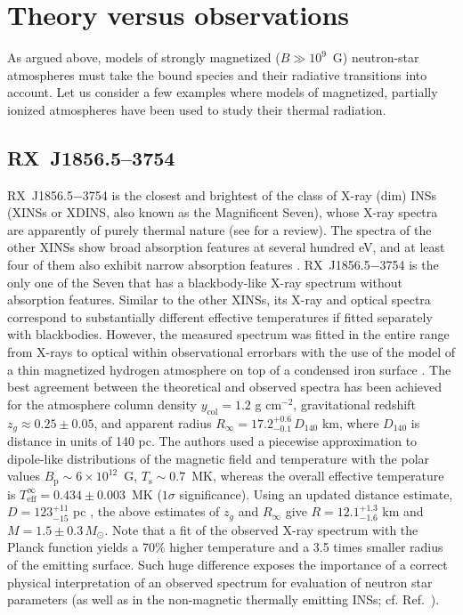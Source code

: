 \documentclass{pos1}
\newcommand{\Teff}{T_\mathrm{eff}}
\newcommand{\Ts}{T_\mathrm{s}}
\newcommand{\ycol}{y_\mathrm{col}}
\begin{document}
\section{Theory versus observations}
\label{sec:obs}

As argued above,  models of strongly magnetized ($B\gg10^9$~G)
neutron-star atmospheres must take the bound species and their
radiative transitions into account. Let us consider a few examples
where models of magnetized, partially ionized atmospheres have been
used to study their thermal radiation.

\subsection{RX~J1856.5--3754}
\label{sec:1856}

RX~J1856.5$-$3754 is the closest and brightest of the class of X-ray
(dim) INSs (XINSs or XDINS, also known as the Magnificent Seven), whose X-ray
spectra are apparently of purely thermal nature (see \cite{Turolla09}
for a review). The spectra of the other XINSs show broad absorption
features at several hundred eV, and at least four of them also exhibit
narrow absorption features \cite{Hohle_ea12}. RX~J1856.5$-$3754 is the
only one of the Seven that has a blackbody-like X-ray spectrum without
absorption features. Similar to the other XINSs, its  X-ray and optical
spectra correspond to substantially different effective temperatures
if fitted separately with blackbodies. However, the measured spectrum
was fitted in the entire range from X-rays to optical within
observational errorbars with the use of the model of a thin magnetized
hydrogen atmosphere on top of a condensed iron surface \cite{Ho_ea07}.
The best agreement between the theoretical and observed spectra has
been achieved for the atmosphere column density $\ycol=1.2$ g
cm$^{-2}$, gravitational redshift $z_g\approx 0.25\pm0.05$, and apparent
radius $R_\infty=17.2^{+0.6}_{-0.1}\,D_{140}$  km, where
$D_{140}$ is distance in units of 140 pc. The authors used a
piecewise approximation to dipole-like distributions of the magnetic
field and temperature with the polar values
$B_\mathrm{p}\sim6\times10^{12}$~G, $\Ts\sim 0.7$~MK, whereas the
overall effective temperature is $\Teff^\infty=0.434\pm0.003$~MK
($1\sigma$ significance). Using an updated distance estimate,
$D=123^{+11}_{-15}$ pc \cite{Walter_ea10}, the above estimates of
$z_g$ and $R_\infty$ give $R=12.1^{+1.3}_{-1.6}$ km and
$M=1.5\pm0.3\,M_\odot$. Note that a fit of the observed X-ray spectrum
with the Planck function yields a 70\% higher temperature and a 3.5
times smaller radius of the emitting surface. Such huge difference
exposes the importance of a correct physical interpretation of an
observed spectrum for evaluation of neutron star parameters (as well
as in the non-magnetic thermally emitting INSs; cf.{}
Ref.~\cite{Heinke_ea14}).
\end{document}
